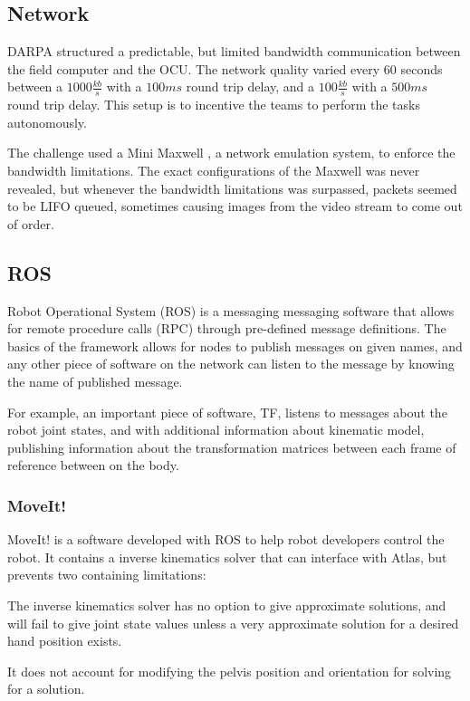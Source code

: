 \documentclass[12pt]{report}
\begin{document}
\subsection{Network}

DARPA structured a predictable, but limited bandwidth communication between the field computer and the OCU. The network quality varied every 60 seconds between a $1000 \frac{kb}{s}$ with a $100ms$ round trip delay, and a $100 \frac{kb}{s}$ with a $500ms$ round trip delay. This setup is to incentive the teams to perform the tasks autonomously.

The challenge used a Mini Maxwell \cite{minimaxwell}, a network emulation system, to enforce the bandwidth limitations. The exact configurations of the Maxwell was never revealed, but whenever the bandwidth limitations was surpassed, packets seemed to be LIFO queued, sometimes causing images from the video stream to come out of order. 

\subsection{ROS}

Robot Operational System (ROS) is a messaging messaging software that allows for remote procedure calls (RPC) through pre-defined message definitions. The basics of the framework allows for nodes to publish messages on given names, and any other piece of software on the network can listen to the message by knowing the name of published message. 

For example, an important piece of software, TF, listens to messages about the robot joint states, and with additional information about kinematic model, publishing information about the transformation matrices between each frame of reference between on the body. 

\subsubsection{MoveIt!}
MoveIt! is a software developed with ROS to help robot developers control the robot. It contains a inverse kinematics solver that can interface with Atlas, but prevents two containing limitations: 
\begin{inparaenum}
\item The inverse kinematics solver has no option to give approximate solutions, and will fail to give joint state values unless a very approximate solution for a desired hand position exists.
\item It does not account for modifying the pelvis position and orientation for solving for a solution. \end{inparaenum}
\end{document}
